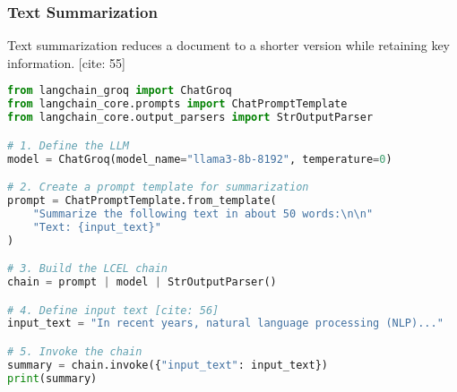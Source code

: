 






\begin{frame}[fragile]\frametitle{Text Summarization}
Text summarization reduces a document to a shorter version while retaining key information. [cite: 55]
\begin{lstlisting}[language=python, basicstyle=\tiny]
from langchain_groq import ChatGroq
from langchain_core.prompts import ChatPromptTemplate
from langchain_core.output_parsers import StrOutputParser

# 1. Define the LLM
model = ChatGroq(model_name="llama3-8b-8192", temperature=0)

# 2. Create a prompt template for summarization
prompt = ChatPromptTemplate.from_template(
    "Summarize the following text in about 50 words:\n\n"
    "Text: {input_text}"
)

# 3. Build the LCEL chain
chain = prompt | model | StrOutputParser()

# 4. Define input text [cite: 56]
input_text = "In recent years, natural language processing (NLP)..." 

# 5. Invoke the chain
summary = chain.invoke({"input_text": input_text})
print(summary)
\end{lstlisting}
\end{frame}

